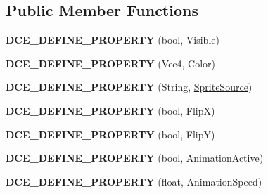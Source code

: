 \subsection*{Public Member Functions}
\begin{DoxyCompactItemize}
\item 
\hypertarget{classDCEngine_1_1Components_1_1Sprite_a8ef78ea1fcd2c7cf3181fd6abe92cde8}{{\bfseries D\-C\-E\-\_\-\-D\-E\-F\-I\-N\-E\-\_\-\-P\-R\-O\-P\-E\-R\-T\-Y} (bool, Visible)}\label{classDCEngine_1_1Components_1_1Sprite_a8ef78ea1fcd2c7cf3181fd6abe92cde8}

\item 
\hypertarget{classDCEngine_1_1Components_1_1Sprite_ae703f79becdf840080d99d656176ba6a}{{\bfseries D\-C\-E\-\_\-\-D\-E\-F\-I\-N\-E\-\_\-\-P\-R\-O\-P\-E\-R\-T\-Y} (Vec4, Color)}\label{classDCEngine_1_1Components_1_1Sprite_ae703f79becdf840080d99d656176ba6a}

\item 
\hypertarget{classDCEngine_1_1Components_1_1Sprite_a80d44b450642b8348b3cb1c5f1cba2ca}{{\bfseries D\-C\-E\-\_\-\-D\-E\-F\-I\-N\-E\-\_\-\-P\-R\-O\-P\-E\-R\-T\-Y} (String, \hyperlink{classDCEngine_1_1SpriteSource}{Sprite\-Source})}\label{classDCEngine_1_1Components_1_1Sprite_a80d44b450642b8348b3cb1c5f1cba2ca}

\item 
\hypertarget{classDCEngine_1_1Components_1_1Sprite_ac118d0ade90c6520c9bde9929309caaa}{{\bfseries D\-C\-E\-\_\-\-D\-E\-F\-I\-N\-E\-\_\-\-P\-R\-O\-P\-E\-R\-T\-Y} (bool, Flip\-X)}\label{classDCEngine_1_1Components_1_1Sprite_ac118d0ade90c6520c9bde9929309caaa}

\item 
\hypertarget{classDCEngine_1_1Components_1_1Sprite_a3926a998bfca61ac408755355cfa7dfd}{{\bfseries D\-C\-E\-\_\-\-D\-E\-F\-I\-N\-E\-\_\-\-P\-R\-O\-P\-E\-R\-T\-Y} (bool, Flip\-Y)}\label{classDCEngine_1_1Components_1_1Sprite_a3926a998bfca61ac408755355cfa7dfd}

\item 
\hypertarget{classDCEngine_1_1Components_1_1Sprite_ad91ac37b5c596275690e78aa6826f9ab}{{\bfseries D\-C\-E\-\_\-\-D\-E\-F\-I\-N\-E\-\_\-\-P\-R\-O\-P\-E\-R\-T\-Y} (bool, Animation\-Active)}\label{classDCEngine_1_1Components_1_1Sprite_ad91ac37b5c596275690e78aa6826f9ab}

\item 
\hypertarget{classDCEngine_1_1Components_1_1Sprite_aacf1b7fbe3e55945109430b3f837202c}{{\bfseries D\-C\-E\-\_\-\-D\-E\-F\-I\-N\-E\-\_\-\-P\-R\-O\-P\-E\-R\-T\-Y} (float, Animation\-Speed)}\label{classDCEngine_1_1Components_1_1Sprite_aacf1b7fbe3e55945109430b3f837202c}


\end{DoxyCompactItemize}
